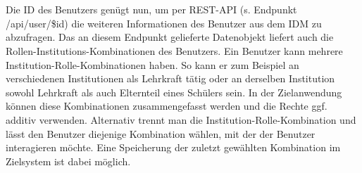 \\
\\
Die ID des Benutzers genügt nun, um per REST-API (s. Endpunkt /api/user/\$id) die weiteren Informationen des Benutzer aus dem IDM zu abzufragen. 
Das an diesem Endpunkt gelieferte Datenobjekt liefert auch die Rollen-Institutions-Kombinationen des Benutzers. 
Ein Benutzer kann mehrere Institution-Rolle-Kombinationen haben. 
So kann er zum Beispiel an verschiedenen Institutionen als Lehrkraft tätig oder an derselben Institution sowohl Lehrkraft als auch Elternteil eines Schülers sein. 
In der Zielanwendung können diese Kombinationen zusammengefasst werden und die Rechte ggf. additiv verwenden. 
Alternativ trennt man die Institution-Rolle-Kombination und lässt den Benutzer diejenige Kombination wählen, mit der der Benutzer interagieren möchte. 
Eine Speicherung der zuletzt gewählten Kombination im Zielsystem ist dabei möglich.
